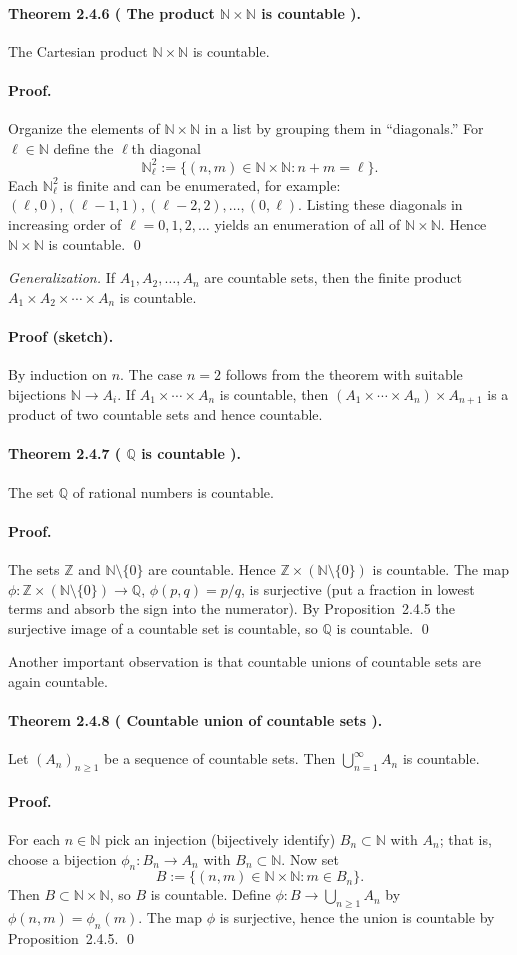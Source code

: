 \documentclass[12pt,a4paper]{article}
\newcommand{\N}{\mathbb{N}}
\newcommand{\Z}{\mathbb{Z}}
\newcommand{\Q}{\mathbb{Q}}
\newcommand{\NumberedTheorem}[3]{%
\paragraph*{Theorem #1 ( #2 ).} #3\par}
\theoremstyle{plain}
\theoremstyle{definition}
\theoremstyle{remark}
\begin{document}
\NumberedTheorem{2.4.6}{The product $\N\times\N$ is countable}{The Cartesian product $\N\times \N$ is countable.}

\paragraph{Proof.} Organize the elements of $\N\times\N$ in a list by grouping them in ``diagonals.'' For $\ell\in\N$ define the $\ell$th diagonal
\[
	\N^{2}_{\ell} := \{ (n,m)\in \N\times\N : n+m = \ell \}.
\]
Each $\N^{2}_{\ell}$ is finite and can be enumerated, for example: $(\ell,0), (\ell-1,1), (\ell-2,2), \dots, (0,\ell)$. Listing these diagonals in increasing order of $\ell=0,1,2,\dots$ yields an enumeration of all of $\N\times\N$. Hence $\N\times\N$ is countable. \qed

\emph{Generalization.} If $A_1, A_2, \dots, A_n$ are countable sets, then the finite product $A_1\times A_2 \times \cdots \times A_n$ is countable.

\paragraph{Proof (sketch).} By induction on $n$. The case $n=2$ follows from the theorem with suitable bijections $\N\to A_i$. If $A_1\times\cdots\times A_n$ is countable, then $(A_1\times\cdots\times A_n)\times A_{n+1}$ is a product of two countable sets and hence countable.

\NumberedTheorem{2.4.7}{$\Q$ is countable}{The set $\Q$ of rational numbers is countable.}

\paragraph{Proof.} The sets $\Z$ and $\N\setminus\{0\}$ are countable. Hence $\Z\times (\N\setminus\{0\})$ is countable. The map $\phi: \Z\times (\N\setminus\{0\}) \to \Q$, $\phi(p,q)=p/q$, is surjective (put a fraction in lowest terms and absorb the sign into the numerator). By Proposition~2.4.5 the surjective image of a countable set is countable, so $\Q$ is countable. \qed

Another important observation is that countable unions of countable sets are again countable.

\NumberedTheorem{2.4.8}{Countable union of countable sets}{Let $(A_n)_{n\ge 1}$ be a sequence of countable sets. Then $\displaystyle\bigcup_{n=1}^{\infty} A_n$ is countable.}

\paragraph{Proof.} For each $n\in\N$ pick an injection (bijectively identify) $B_n\subset \N$ with $A_n$; that is, choose a bijection $\phi_n: B_n\to A_n$ with $B_n\subset \N$. Now set
\[
	B := \{ (n,m)\in \N\times\N : m\in B_n\}.
\]
Then $B\subset \N\times\N$, so $B$ is countable. Define $\phi: B\to \bigcup_{n\ge1} A_n$ by $\phi(n,m)=\phi_n(m)$. The map $\phi$ is surjective, hence the union is countable by Proposition~2.4.5. \qed
\end{document}
